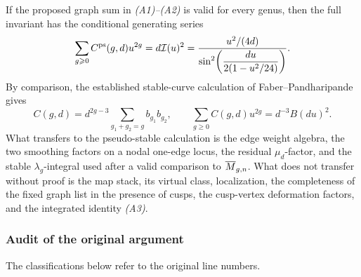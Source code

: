\documentclass[12pt]{memoir}
\begin{document}
If the proposed graph sum in \emph{(A1)--(A2)} is valid for every genus,
then the full invariant has the conditional generating series
\begin{equation}\label{eq:correct-Cps-generating}
 \sum_{g\geqslant0}C^{\operatorname{\mathrm{ps}}}(g,d)u^{2g}
 =d\mathcal{I}(u)^2
 =\frac{u^2/(4d)}
 {\sin^2\!\left(\dfrac{du}{2(1-u^2/24)}\right)}.
\end{equation}
By comparison, the established stable-curve calculation of
Faber--Pandharipande gives
\[
 C(g,d)=d^{2g-3}\sum_{g_1+g_2=g}b_{g_1}b_{g_2},\qquad
 \sum_{g\geq0}C(g,d)u^{2g}=d^{-3}B(du)^2.
\]
What transfers to the pseudo-stable calculation is the edge weight algebra,
the two smoothing factors on a nodal one-edge locus, the residual
\(\mu_d\)-factor, and the stable \(\lambda_g\)-integral used after a valid
comparison to \(\overline M_{g,n}\).  What does not transfer without proof is the
map stack, its virtual class, localization, the completeness of the fixed
graph list in the presence of cusps, the cusp-vertex deformation factors,
and the integrated identity \emph{(A3)}.

\subsubsection{Audit of the original argument}

The classifications below refer to the original line numbers.
\end{document}

